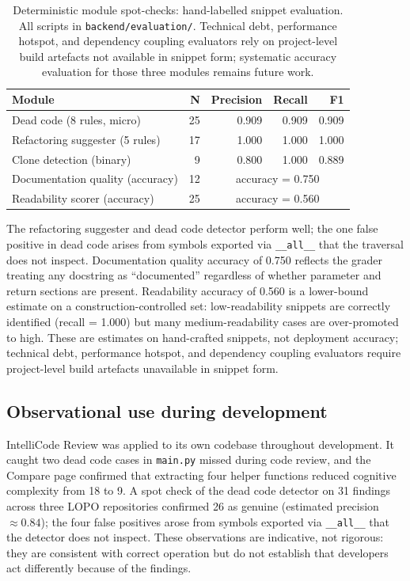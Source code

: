 \documentclass[12pt, oneside]{report}
\begin{document}
\begin{table}[H]
\centering
\small
\caption{Deterministic module spot-checks: hand-labelled snippet evaluation. All scripts
in \texttt{backend/evaluation/}. Technical debt, performance hotspot, and dependency
coupling evaluators rely on project-level build artefacts not available in snippet form;
systematic accuracy evaluation for those three modules remains future work.}
\label{tab:det-spotchecks}
\begin{tabular}{@{}lrrrr@{}}
\toprule
\textbf{Module} & \textbf{N} & \textbf{Precision} & \textbf{Recall} & \textbf{F1} \\
\midrule
Dead code (8 rules, micro)     & 25 & 0.909 & 0.909 & 0.909 \\
Refactoring suggester (5 rules) & 17 & 1.000 & 1.000 & 1.000 \\
Clone detection (binary)        &  9 & 0.800 & 1.000 & 0.889 \\
Documentation quality (accuracy)& 12 & \multicolumn{3}{c}{accuracy = 0.750} \\
Readability scorer (accuracy)   & 25 & \multicolumn{3}{c}{accuracy = 0.560} \\
\bottomrule
\end{tabular}
\end{table}

The refactoring suggester and dead code detector perform well; the one false positive in dead code arises from symbols exported via \texttt{\_\_all\_\_} that the traversal does not inspect. Documentation quality accuracy of 0.750 reflects the grader treating any docstring as ``documented'' regardless of whether parameter and return sections are present. Readability accuracy of 0.560 is a lower-bound estimate on a construction-controlled set: low-readability snippets are correctly identified (recall = 1.000) but many medium-readability cases are over-promoted to high. These are estimates on hand-crafted snippets, not deployment accuracy; technical debt, performance hotspot, and dependency coupling evaluators require project-level build artefacts unavailable in snippet form.

\subsection{Observational use during development}
\label{ssec:informal-validation}

IntelliCode Review was applied to its own codebase throughout development. It caught two dead code cases in \texttt{main.py} missed during code review, and the Compare page confirmed that extracting four helper functions reduced cognitive complexity from 18 to 9. A spot check of the dead code detector on 31 findings across three LOPO repositories confirmed 26 as genuine (estimated precision $\approx 0.84$); the four false positives arose from symbols exported via \texttt{\_\_all\_\_} that the detector does not inspect. These observations are indicative, not rigorous: they are consistent with correct operation but do not establish that developers act differently because of the findings.
\end{document}
